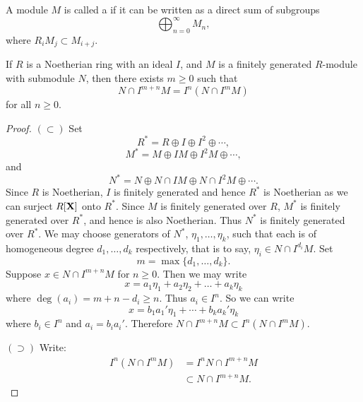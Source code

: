 \documentclass{ximera}
\begin{document}
\begin{definition}
  A module $M$ is called a  if it can be written
  as a direct sum of subgroups
  \[
  \bigoplus_{n =0}^\infty M_n,
  \]
  where $R_iM_j \subset M_{i + j}$.
\end{definition}










\begin{theorem}\label{L:ArtinRees}
  If $R$ is a Noetherian ring with an ideal $I$, and $M$ is a finitely
  generated $R$-module with submodule $N$, then there exists $m\ge 0$
  such that
  \[
  N\cap I^{m+n}M = I^n(N\cap I^m M)
  \]
  for all $n\ge 0$.
  \begin{proof}
    $(\subset)$ Set
    \[
    R^* = R \oplus I \oplus I^2 \oplus \cdots,
    \]
    \[
    M^* = M \oplus IM \oplus I^2M \oplus \cdots,
    \]
    and
    \[
    N^* = N \oplus N \cap IM \oplus N \cap I^2M \oplus \cdots.
    \]
    Since $R$ is Noetherian, $I$ is finitely generated and hence $R^*$
    is Noetherian as we can surject $R[\mathbf X]$ onto $R^*$.  Since $M$ is
    finitely generated over $R$, $M^*$ is finitely generated over
    $R^*$, and hence is also Noetherian.  Thus $N^*$ is finitely
    generated over $R^*$.  We may choose generators of $N^*$,
    $\eta_1,\ldots,\eta_k$, such that each is of homogeneous degree
    $d_1,\ldots,d_k$ respectively, that is to say, $\eta_i\in N\cap
    I^{d_i}M$.  Set
    \[
    m = \max\{d_1,\dots, d_k \}.
    \]  
    Suppose $x \in N \cap I^{m+n}M$ for $n \ge 0$.  Then we may write 
    \[
    x =  a_1 \eta_1 + a_2 \eta_2 + \dots + a_k \eta_k
    \]
    where $\deg(a_i) = m + n - d_i \ge n$.  Thus $a_i \in I^n$.  So we can write
    \[
    x = b_1a_1'\eta_1 + \cdots + b_ka_k'\eta_k
    \]
    where $b_i \in I^n$ and $a_i = b_ia_i'$.  Therefore $N \cap I^{m + n}M
    \subset I^n(N \cap I^m M)$.

    $(\supset)$ Write:
    \begin{align*}
      I^n(N\cap I^m M) &= I^n N\cap I^{m+n} M\\
      &\subset N\cap I^{m+n}M.
    \end{align*}
  \end{proof}
\end{theorem}
\end{document}
